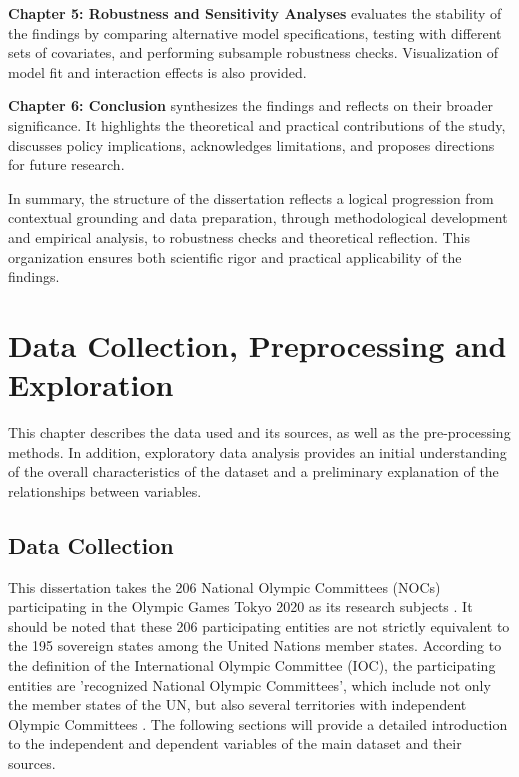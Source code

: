 \documentclass[11pt,twoside]{article}
\numberwithin{Theorem}{section}
\numberwithin{Definition}{section}
\numberwithin{Lemma}{section}
\numberwithin{Algorithm}{section}
\numberwithin{equation}{section}
\begin{document}
\textbf{Chapter 5: Robustness and Sensitivity Analyses} evaluates the stability of the findings by comparing alternative model specifications, testing with different sets of covariates, and performing subsample robustness checks. Visualization of model fit and interaction effects is also provided.  

\textbf{Chapter 6: Conclusion} synthesizes the findings and reflects on their broader significance. It highlights the theoretical and practical contributions of the study, discusses policy implications, acknowledges limitations, and proposes directions for future research.  

In summary, the structure of the dissertation reflects a logical progression from contextual grounding and data preparation, through methodological development and empirical analysis, to robustness checks and theoretical reflection. This organization ensures both scientific rigor and practical applicability of the findings.


\section{Data Collection, Preprocessing and Exploration}
This chapter describes the data used and its sources, as well as the pre-processing methods. In addition, exploratory data analysis provides an initial understanding of the overall characteristics of the dataset and a preliminary explanation of the relationships between variables.
\label{sec:background}

\subsection{Data Collection}
This dissertation takes the 206 National Olympic Committees (NOCs) participating in the Olympic Games Tokyo 2020 as its research subjects \cite{IOC2025NOCs}. It should be noted that these 206 participating entities are not strictly equivalent to the 195 sovereign states among the United Nations member states. According to the definition of the International Olympic Committee (IOC), the participating entities are 'recognized National Olympic Committees', which include not only the member states of the UN, but also several territories with independent Olympic Committees \cite{IOC2024Charter}. The following sections will provide a detailed introduction to the independent and dependent variables of the main dataset and their sources.
\end{document}
